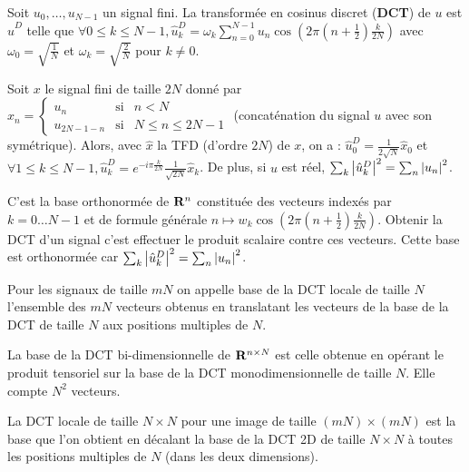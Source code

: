 \begin{defn}
	Soit $u_0,\ldots,u_{N - 1}$ un signal fini.
	La transformée en cosinus discret (\textbf{DCT}) de $u$ est $\hat{u}^D$ telle que
	$\forall 0 \leq k \leq N - 1, \hat{u}^D_k = \omega_k \sum_{n = 0}^{N - 1} u_n \cos \left( 2\pi \left( n + \frac{1}{2} \right) \frac{k}{2N} \right)$
	avec $\omega_0 = \sqrt{\frac{1}{N}}$ et $\omega_k = \sqrt{\frac{2}{N}}$ pour $k \neq 0$.
\end{defn}

\begin{pop}
	Soit $x$ le signal fini de taille $2N$ donné par
	$x_n = \left\{ \begin{array}{ccl}
		u_n & \text{si} & n < N \\
		u_{2N - 1 - n} & \text{si} & N \leq n \leq 2N - 1
	\end{array}\right .$
	(concaténation du signal $u$ avec son symétrique).
	Alors, avec $\hat{x}$ la TFD (d'ordre $2N$) de $x$, on a :
	$\hat{u}^D_0 = \frac{1}{2\sqrt{N}} \hat{x}_0$
	et $\forall 1 \leq k \leq N - 1, \hat{u}_k^D = e^{-i\pi \frac{k}{2N}} \frac{1}{\sqrt{2N}} \hat{x}_k$.
	De plus, si $u$ est réel, $\sum_k \left\lvert\hat{u}_k^D\right\rvert^2 = \sum_n \left\lvert u_n\right\rvert^2$.
\end{pop}

\begin{defn}
	C'est la base orthonormée de $\mathbf{R}^n$ constituée des vecteurs indexés par $k = 0 \ldots N-1$ et de formule générale
	$n \mapsto w_k \cos \left( 2\pi \left( n + \frac{1}{2} \right) \frac{k}{2N} \right)$.
	Obtenir la DCT d'un signal c'est effectuer le produit scalaire contre ces vecteurs.
	Cette base est orthonormée car $\sum_k \left\lvert\hat{u}_k^D\right\rvert^2 = \sum_n \left\lvert u_n\right\rvert^2$.
\end{defn}

\begin{defn}
	Pour les signaux de taille $mN$ on appelle base de la DCT locale de taille $N$ l'ensemble des $mN$ vecteurs obtenus en translatant les vecteurs de la base de la DCT de taille $N$ aux positions multiples de $N$.
\end{defn}

\begin{defn}
	La base de la DCT bi-dimensionnelle de $\mathbf{R}^{n \times N}$ est celle obtenue en opérant le produit tensoriel sur la base de la DCT monodimensionnelle de taille $N$.
	Elle compte $N^2$ vecteurs.
\end{defn}

\begin{defn}
	La DCT locale de taille $N \times N$ pour une image de taille $(mN) \times (mN)$ est la base que l'on obtient en décalant la base de la DCT 2D de taille $N \times N$ à toutes les positions multiples de $N$ (dans les deux dimensions).
\end{defn}
